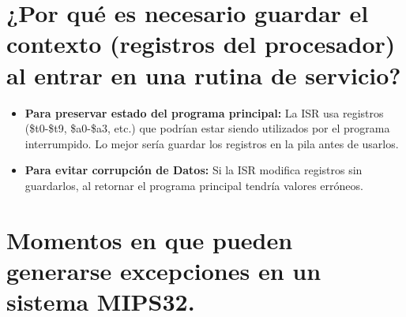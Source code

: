 \documentclass{article}
\begin{document}
\section*{¿Por qué es necesario guardar el contexto (registros del procesador) al entrar en una rutina de servicio?}

\begin{itemize}
    \item \textbf{Para preservar estado del programa principal: }La ISR usa registros (\$t0-\$t9, \$a0-\$a3, etc.) que podrían estar siendo utilizados por el programa interrumpido. Lo mejor sería guardar los registros en la pila antes de usarlos.
    \item \textbf{Para evitar corrupción de Datos: }Si la ISR modifica registros sin guardarlos, al retornar el programa principal tendría valores erróneos.
    
\end{itemize}

\section*{Momentos en que pueden generarse excepciones en un sistema MIPS32.}
\end{document}
